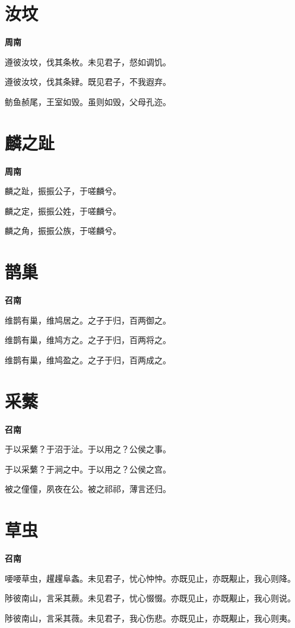 \documentclass[12pt,a4paper]{ctexbook}
\begin{document}
\section{汝坟}
\textbf{周南}\par\vspace{0.5em}
遵彼汝坟，伐其条枚。未见君子，惄如调饥。\par
遵彼汝坟，伐其条肄。既见君子，不我遐弃。\par
鲂鱼赪尾，王室如毁。虽则如毁，父母孔迩。\par

\section{麟之趾}
\textbf{周南}\par\vspace{0.5em}
麟之趾，振振公子，于嗟麟兮。\par
麟之定，振振公姓，于嗟麟兮。\par
麟之角，振振公族，于嗟麟兮。\par

\section{鹊巢}
\textbf{召南}\par\vspace{0.5em}
维鹊有巢，维鸠居之。之子于归，百两御之。\par
维鹊有巢，维鸠方之。之子于归，百两将之。\par
维鹊有巢，维鸠盈之。之子于归，百两成之。\par

\section{采蘩}
\textbf{召南}\par\vspace{0.5em}
于以采蘩？于沼于沚。于以用之？公侯之事。\par
于以采蘩？于涧之中。于以用之？公侯之宫。\par
被之僮僮，夙夜在公。被之祁祁，薄言还归。\par

\section{草虫}
\textbf{召南}\par\vspace{0.5em}
喓喓草虫，趯趯阜螽。未见君子，忧心忡忡。亦既见止，亦既觏止，我心则降。\par
陟彼南山，言采其蕨。未见君子，忧心惙惙。亦既见止，亦既觏止，我心则说。\par
陟彼南山，言采其薇。未见君子，我心伤悲。亦既见止，亦既觏止，我心则夷。\par
\end{document}
